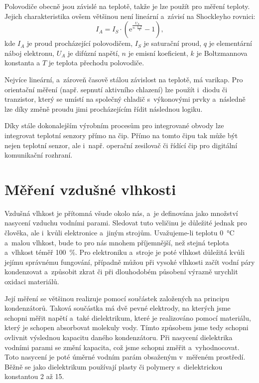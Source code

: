 Polovodiče obecně jsou závislé na teplotě, takže je lze použít pro měření teploty. Jejich charakteristika ovšem většinou není lineární a~závisí na Shockleyho rovnici:
\begin{equation}
    I_A =I_S \cdot (\mathrm{e} ^{\frac{U_A}{n \cdot \frac{k \cdot T}{q}}} - 1),
    \label{eq_Shockley}
\end{equation}
kde $I_{A}$ je proud procházející polovodičem, $I_{S}$ je saturační proud, $q$ je elementární náboj elektronu, $U_{A}$ je difúzní napětí, $n$ je emisní koeficient, $k$ je Boltzmannova konstanta a $T$ je teplota přechodu polovodiče.

Nejvíce lineární, a~zároveň časově stálou závislost na teplotě, má varikap. Pro orientační měření (např. sepnutí aktivního chlazení) lze použít i~diodu či tranzistor, který se umístí na společný chladič s~výkonovými prvky a~následně lze díky změně proudu jimi procházejícím řídit následnou logiku.

Díky stále dokonalejším výrobním procesům pro integrované obvody lze integrovat teplotní senzory přímo na čip. Přímo na tomto čipu tak může být nejen teplotní senzor, ale i~např. operační zesilovač či řídící čip pro digitální komunikační rozhraní. \cite{teor_TempMeas} \cite{teor_TempSens}

\section{Měření vzdušné vlhkosti}

Vzdušná vlhkost je přítomná všude okolo nás, a~je definována jako množství nasycení vzduchu vodními parami. Sledovat tuto veličinu je důležité jednak pro člověka, ale i~kvůli elektronice a~jiným strojům. Uvažujeme-li teplotu \SI{0}{\celsius} a~malou vlhkost, bude to pro nás mnohem příjemnější, než stejná teplota a~vlhkost téměř \SI{100}{\percent}. Pro elektroniku a~stroje je poté vlhkost důležitá kvůli jejímu správnému fungování, případně můžou při vysoké vlhkosti začít vodní páry kondenzovat a~způsobit zkrat či při dlouhodobém působení výrazně urychlit oxidaci materiálů.

Její měření se většinou realizuje pomocí součástek založených na principu kondenzátorů. Taková součástka má dvě pevné elektrody, na kterých jsme schopni měřit napětí a~také dielektrikum, které je realizováno pomocí materiálu, který je schopen absorbovat molekuly vody. Tímto způsobem jsme tedy schopni ovlivnit výslednou kapacitu daného kondenzátoru. Při nasycení dielektrika vodními parami se změní kapacita, což jsme schopni změřit a~vyhodnocovat. Toto nasycení je poté úměrné vodním parám obsaženým v~měřeném prostředí. Běžně se jako dielektrikum používají plasty či polymery s~dielektrickou konstantou 2 až 15. \cite{teor_HumSensor}

